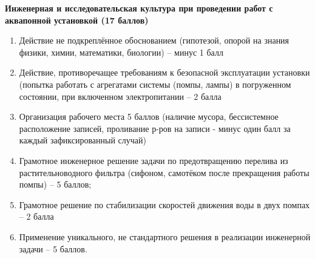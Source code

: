 \textbf{Инженерная и исследовательская культура при проведении работ с аквапонной установкой (17 баллов)}

\begin{enumerate}
    \item Действие не подкреплённое обоснованием (гипотезой, опорой на знания физики, химии, математики, биологии) – минус 1 балл 
    \item	Действие, противоречащее требованиям к безопасной эксплуатации установки (попытка работать с агрегатами системы (помпы, лампы) в погруженном состоянии, при включенном электропитании – 2 балла
    \item	Организация рабочего места 5 баллов (наличие мусора, бессистемное расположение записей, проливание р-ров на записи -  минус один балл за каждый зафиксированный случай)
    \item	Грамотное инженерное решение задачи по предотвращению перелива из растительноводного фильтра (сифоном, самотёком после прекращения работы помпы) – 5 баллов;
    \item	Грамотное решение по стабилизации скоростей движения воды в двух помпах – 2 балла
    \item	Применение уникального, не стандартного решения в реализации инженерной задачи – 5 баллов.
\end{enumerate}

